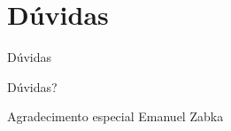 \section{Dúvidas}
\begin{frame}{Dúvidas}
	\begin{center}
		{\Huge Dúvidas?}
	\end{center}
	\begin{flushright}
		{\tiny Agradecimento especial Emanuel Zabka}
	\end{flushright}
\end{frame}
